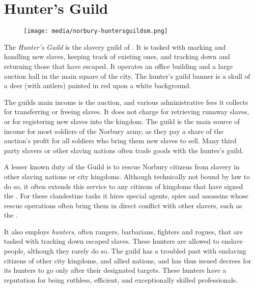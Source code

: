 \section{Hunter's Guild}
\label{sec:Hunters Guild}

\begin{figure}[!ht]
  \centering
  \texttt{[image: media/norbury-huntersguildsm.png]}
\end{figure}

The \emph{Hunter's Guild} is the slavery guild of . It is
tasked with marking and handling new slaves, keeping track of existing ones,
and tracking down and returning those that have escaped. It operates an office
building and a large auction hall in the main square of the city. The hunter's
guild banner is a skull of a deer (with antlers) painted in red upon a white
background.

The guilds main income is the auction, and various administrative fees it
collects for transferring or freeing slaves. It does not charge for retrieving
runaway slaves, or for registering new slaves into the kingdom. The guild is
the main source of income for most soldiers of the Norbury army, as they pay a
share of the auction's profit for all soldiers who bring them new slaves to
sell. Many third party slavers or other slaving nations often trade goods with
the hunter's guild.

A lesser known duty of the Guild is to rescue Norbury citizens from slavery in
other slaving nations or city kingdoms. Although technically not bound by law
to do so, it often extends this service to any citizens of kingdoms that have
signed the . For these clandestine tasks it hires
special agents, spies and assassins whose rescue operations often bring them
in direct conflict with other slavers, such as the .

It also employs \emph{hunters}, often rangers, barbarians, fighters and
rogues, that are tasked with tracking down escaped slaves. These hunters are
allowed to enslave people, although they rarely do so. The guild has a
troubled past with enslaving citizens of other city kingdoms, and allied
nations, and has thus issued decrees for its hunters to go only after their
designated targets. These hunters have a reputation for being ruthless,
efficient, and exceptionally skilled professionals.

